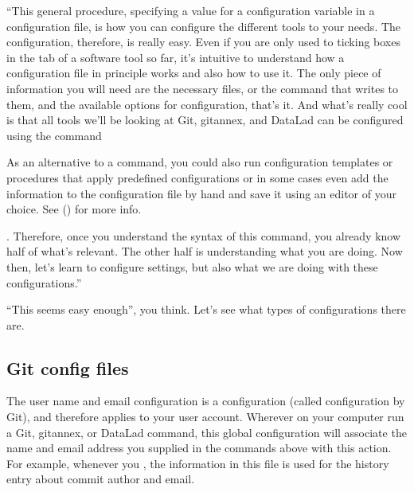 \sphinxAtStartPar
“This general procedure, specifying a value for a configuration
variable in a configuration file, is how you can configure the
different tools to your needs. The configuration, therefore,
is really easy. Even if you are only used to ticking boxes
in the  tab of a software tool so far, it’s intuitive
to understand how a configuration file in principle works and also
how to use it. The only piece of information you will need
are the necessary files, or the command that writes to them, and
the available options for configuration, that’s it. And what’s
really cool is that all tools we’ll be looking at \textendash{} Git, git\sphinxhyphen{}annex,
and DataLad \textendash{} can be configured using the 
command%
\begin{footnote}\sphinxAtStartFootnote
As an alternative to a  command, you could also run configuration
templates or procedures that apply predefined configurations or in some cases even
add the information to the configuration file by hand and save it using an editor of your choice. See {\hyperref[\detokenize{basics/101-124-procedures:procedures}]{}} () for more info.
%
\end{footnote}. Therefore, once you understand the syntax of this
command, you already know half of what’s relevant. The other half
is understanding what you are doing. Now then, let’s learn 
to configure settings, but also  what we are doing
with these configurations.”

\sphinxAtStartPar
“This seems easy enough”, you think. Let’s see what types of
configurations there are.


\subsection{Git config files}
\label{\detokenize{basics/101-122-config:git-config-files}}
\sphinxAtStartPar
The user name and email configuration
is a  configuration (called 
configuration by Git), and therefore applies to your user account.
Wherever on your computer  run a Git, git\sphinxhyphen{}annex, or DataLad
command, this global configuration will
associate the name and email address you supplied in
the  commands above with this action.
For example, whenever you
, the information in this file is used for the
history entry about commit author and email.

